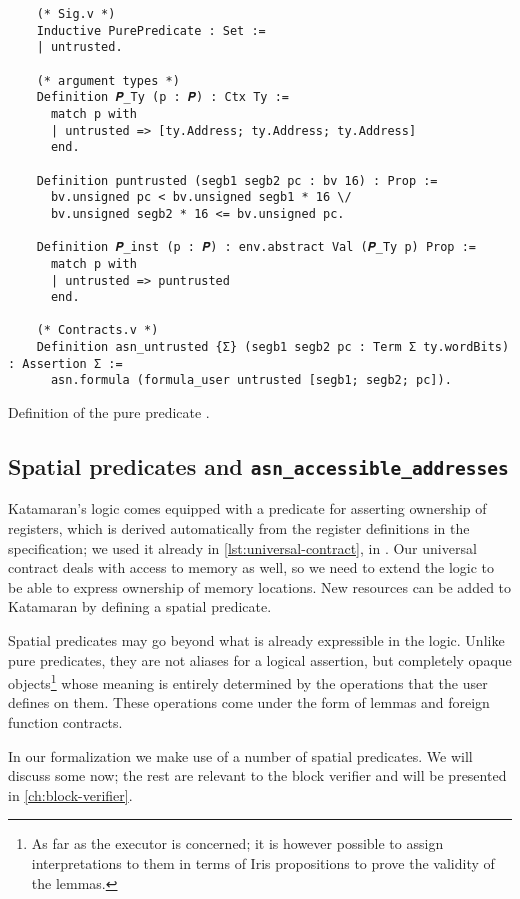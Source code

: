 \begin{listing}[htb]
  \begin{verbatim}
    (* Sig.v *)
    Inductive PurePredicate : Set :=
    | untrusted.

    (* argument types *)
    Definition 𝑷_Ty (p : 𝑷) : Ctx Ty :=
      match p with
      | untrusted => [ty.Address; ty.Address; ty.Address]
      end.

    Definition puntrusted (segb1 segb2 pc : bv 16) : Prop :=
      bv.unsigned pc < bv.unsigned segb1 * 16 \/
      bv.unsigned segb2 * 16 <= bv.unsigned pc.

    Definition 𝑷_inst (p : 𝑷) : env.abstract Val (𝑷_Ty p) Prop :=
      match p with
      | untrusted => puntrusted
      end.

    (* Contracts.v *)
    Definition asn_untrusted {Σ} (segb1 segb2 pc : Term Σ ty.wordBits) : Assertion Σ :=
      asn.formula (formula_user untrusted [segb1; segb2; pc]).
  \end{verbatim}
  \caption{Definition of the pure predicate .}
  \label{lst:pure-untrusted}
\end{listing}

\subsection{Spatial predicates and \texttt{asn\_accessible\_addresses}}
\label{sec:spatial-preds}

Katamaran's logic comes equipped with a predicate for asserting ownership of registers, which is derived automatically from the register definitions in the \usail specification; we used it already in \cref{lst:universal-contract}, \eg in . Our universal contract deals with access to memory as well, so we need to extend the logic to be able to express ownership of memory locations. New resources can be added to Katamaran by defining a spatial predicate.

Spatial predicates may go beyond what is already expressible in the logic. Unlike pure predicates, they are not aliases for a logical assertion, but completely opaque objects\footnote{As far as the executor is concerned; it is however possible to assign interpretations to them in terms of Iris propositions to prove the validity of the lemmas.} whose meaning is entirely determined by the operations that the user defines on them. These operations come under the form of lemmas and foreign function contracts.

In our formalization we make use of a number of spatial predicates. We will discuss some now; the rest are relevant to the block verifier and will be presented in \cref{ch:block-verifier}.

